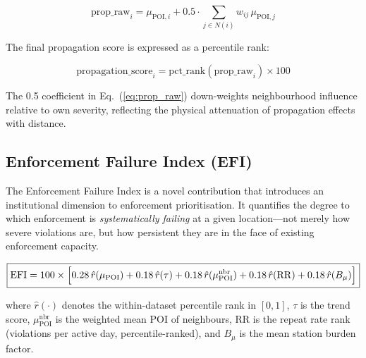 \documentclass[12pt,a4paper]{article}
\begin{document}
\begin{equation}
\text{prop\_raw}_i = \mu_{\mathrm{POI},i}
  + 0.5 \cdot \sum_{j \in N(i)} w_{ij}\,\mu_{\mathrm{POI},j}
\label{eq:prop_raw}
\end{equation}

The final propagation score is expressed as a percentile rank:

\begin{equation}
\text{propagation\_score}_i = \mathrm{pct\_rank}\!\left(\text{prop\_raw}_i\right) \times 100
\label{eq:prop}
\end{equation}

The 0.5 coefficient in Eq.~(\ref{eq:prop_raw}) down-weights neighbourhood influence relative
to own severity, reflecting the physical attenuation of propagation effects with distance.

\subsection{Enforcement Failure Index (EFI)}

The Enforcement Failure Index is a novel contribution that introduces an institutional
dimension to enforcement prioritisation. It quantifies the degree to which enforcement is
\emph{systematically failing} at a given location—not merely how severe violations are,
but how persistent they are in the face of existing enforcement capacity.

\begin{equation}
\boxed{
\mathrm{EFI} = 100 \times \Bigl[
  0.28\,\hat{r}(\mu_{\mathrm{POI}})
  + 0.18\,\hat{r}(\tau)
  + 0.18\,\hat{r}(\mu_{\mathrm{POI}}^{\mathrm{nbr}})
  + 0.18\,\hat{r}(\mathrm{RR})
  + 0.18\,\hat{r}(B_\mu)
\Bigr]
}
\label{eq:efi}
\end{equation}

where $\hat{r}(\cdot)$ denotes the within-dataset percentile rank in $[0,1]$, $\tau$ is the
trend score, $\mu_{\mathrm{POI}}^{\mathrm{nbr}}$ is the weighted mean POI of neighbours,
$\mathrm{RR}$ is the repeat rate rank (violations per active day, percentile-ranked), and
$B_\mu$ is the mean station burden factor.
\end{document}
